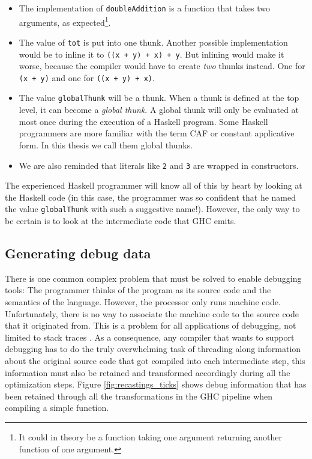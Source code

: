 \begin{itemize}
  \item
    The implementation of \texttt{doubleAddition} is a function that
    takes two arguments, as expected\footnote{It could in theory be a
      function taking one argument returning another function of one
      argument.}.
  \item
    The value of \texttt{tot} is put into one thunk. Another possible
    implementation would be to inline it to \texttt{((x + y) + x) +
      y}. But inlining would make it worse, because the compiler would
    have to create \emph{two} thunks instead. One for \texttt{(x +
      y)} and one for \texttt{((x + y) + x)}.
  \item
    The value \texttt{globalThunk} will be a thunk. When a thunk is
    defined at the top level, it can become a \emph{global thunk}.
    A global thunk will only be evaluated at most once during the
    execution of a Haskell program. Some Haskell programmers are more
    familiar with the term CAF or constant applicative form. In this
    thesis we call them global thunks.
  \item
    We are also reminded that literals like \texttt{2} and \texttt{3}
    are wrapped in constructors.

\end{itemize}

The experienced Haskell programmer will know all of this by heart
by looking at the Haskell code (in this case, the programmer was so
confident that he named the value \texttt{globalThunk} with such a
suggestive name!). However, the only way to be certain is
to look at the intermediate code that GHC emits.


\subsection{Generating debug data}

There is one common complex problem that must be solved to enable debugging
tools: The programmer thinks of the program as its source code and the
semantics of the language. However, the processor only runs machine code.
Unfortunately, there is no way to associate the machine code to the
source code that it originated from. This is a problem for all applications of
debugging, not limited to stack traces \cite{eager2012introduction}. As a consequence, any
compiler that wants to support debugging has to do the truly overwhelming task of threading along
information about the original source code that got compiled into each
intermediate step, this information must also be retained and transformed
accordingly during all the optimization steps. Figure
\ref{fig:recastings_ticks} shows
debug information that has been retained through all the transformations in
the GHC pipeline when compiling a simple function.

